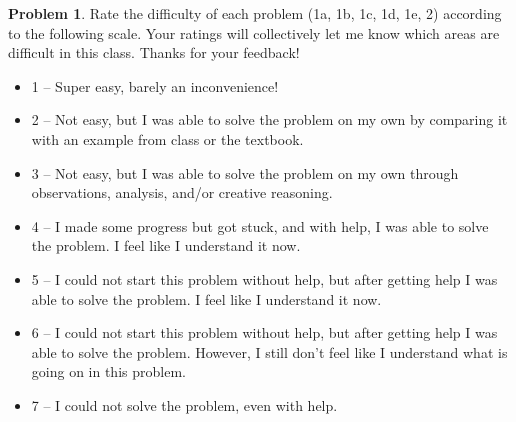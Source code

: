 \documentclass[11pt,oneside]{amsart}
\theoremstyle{definition}
\newtheorem{problem}{Problem}
\theoremstyle{plain}
\begin{document}
\begin{problem}
Rate the difficulty of each problem (1a, 1b, 1c, 1d, 1e, 2) according to the following scale. Your ratings will collectively let me know which areas are difficult in this class. Thanks for your feedback!
\begin{itemize}
  \item 1 -- Super easy, barely an inconvenience!
  \item 2 -- Not easy, but I was able to solve the problem on my own by comparing it with an example from class or the textbook.
  \item 3 -- Not easy, but I was able to solve the problem on my own through observations, analysis, and/or creative reasoning.
  \item 4 -- I made some progress but got stuck, and with help, I was able to solve the problem. I feel like I understand it now.
  \item 5 -- I could not start this problem without help, but after getting help I was able to solve the problem. I feel like I understand it now.
  \item 6 -- I could not start this problem without help, but after getting help I was able to solve the problem. However, I still don't feel like I understand what is going on in this problem.
  \item 7 -- I could not solve the problem, even with help.
\end{itemize}
\end{problem}
\end{document}
